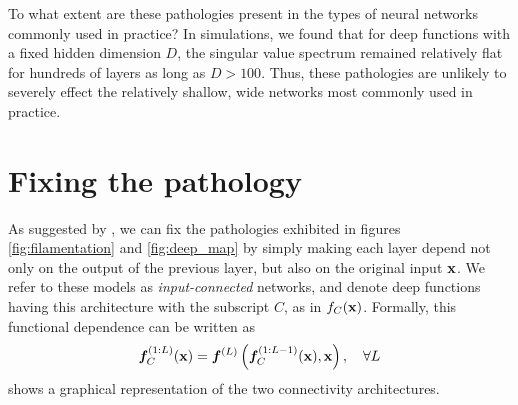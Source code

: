 \documentclass{article} %
\begin{document}
To what extent are these pathologies present in the types of neural networks commonly used in practice?
In simulations, we found that for deep functions with a fixed hidden dimension $D$, the singular value spectrum remained relatively flat for hundreds of layers as long as $D > 100$.
Thus, these pathologies are unlikely to severely effect the relatively shallow, wide networks most commonly used in practice.





\section{Fixing the pathology}
\label{sec:fix}

As suggested by \citet[chapter 2]{neal1995bayesian}, we can fix the pathologies exhibited in figures \cref{fig:filamentation} and \ref{fig:deep_map} by simply making each layer depend not only on the output of the previous layer, but also on the original input ${\bf{x}}$.  
We refer to these models as \emph{input-connected} networks, and denote deep functions having this architecture with the subscript $C$, as in $f_C({\bf{x}})$.
Formally, this functional dependence can be written as
\begin{align}
\boldsymbol{f}_C^{(1:L)}({\bf{x}}) = \boldsymbol{f}^{(L)} \left( \boldsymbol{f}_C^{(1:L-1)}({\bf{x}}), {\bf{x}} \right), \quad \forall L
\end{align}
%
 shows a graphical representation of the two connectivity architectures.
\end{document}
